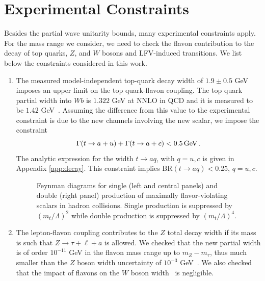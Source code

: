 \documentclass[prd,amsfonts,onecolumn,superscriptaddress,aps,nofootinbib,11pt]{revtex4-1}
\begin{document}
\section{Experimental Constraints}
\label{exp-const}
 
 Besides the partial wave unitarity bounds, many experimental constraints apply. For the mass range we consider, we need to check the flavon contribution to the decay of top quarks, $Z$, and $W$ bosons and LFV-induced transitions. We list below the constraints considered in this work.

\begin{enumerate}
\item The measured model-independent top-quark decay width of $1.9 \pm 0.5$ GeV~\cite{ParticleDataGroup:2022pth} imposes an upper limit on the top quark-flavon coupling. The top quark partial width into $Wb$ is $1.322$ GeV at NNLO in QCD and it is measured to be $1.42$ GeV~\cite{ParticleDataGroup:2022pth}. Assuming the difference from this value to the experimental constraint is due to the new channels involving the new scalar, we impose the constraint
\begin{equation}
\Gamma(t\to a+u)+\Gamma(t\to a+c) < 0.5 \, \hbox{GeV}\, . 
\label{eq:br}
\end{equation}
The analytic expression for the width $t \to aq$, with $q = u,c$ is given in Appendix \ref{app:decay}. This constraint implies $\mathrm{BR}(t\to aq)<0.25$, $q=u,c$.


\begin{figure}[!ht]
    \centering
          
    \caption{Feynman diagrams for single (left and central panels) and double (right panel) production of maximally flavor-violating scalars in hadron collisions. Single production is suppressed by $(m_t/\Lambda)^2$ while double production is suppressed by $(m_t/\Lambda)^4$.}
    \label{fig:prod}
\end{figure}

 \item The lepton-flavon coupling contributes to the $Z$ total decay width if its mass is such that $Z\to \tau+\ell+a$ is allowed. We checked that the new partial width is of order $10^{-11}$ GeV in the flavon mass range up to $m_Z-m_\tau$, thus much smaller than the $Z$ boson width uncertainty of $10^{-3}$ GeV~\cite{2006257}. We also checked that the impact of flavons on the $W$ boson width~\cite{https://doi.org/10.48550/arxiv.1012.2367} is negligible.
 

\end{enumerate}
\end{document}
